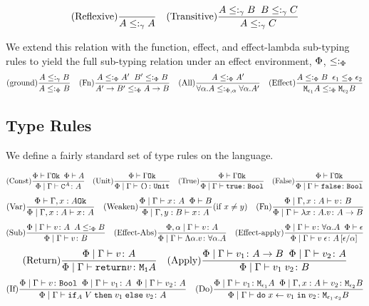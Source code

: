 \documentclass{Report}
\begin{document}
    \[
        \treerule{Reflexive}{}{A \subtype_{\ground} A}
        \quad
        \treerule{Transitive}{A \subtype_{\ground} B \s \s B \subtype_{\ground} C}{A \subtype_{\ground} C}
    \]

    We extend this relation with the function, effect, and effect-lambda sub-typing rules to yield the full sub-typing relation under an effect environment, $\P$, $\subtypep$
\[
    \treerule{ground}{A \subtype_{\ground} B}{A \subtypep B}
    \quad
    \treerule{Fn}{A \subtypep A' \s\s B' \subtypep B }{\fntype{A'}{B'} \subtypep \ab}
    \quad
    \treerule{All}{A\subtypep A'}{\all{\a}{A}\subtypepa\all{\a}{A'}}
    \quad
    \treerule{Effect}{A\subtypep B\s\s \e_1\subeffectp\e_2}{\M{\e_1}{A}\subtypep\M{\e_2}{B}}
\]


\subsection{Type Rules}
We define a fairly standard set of type rules on the language.

\[
    \treerule{Const}{\oke{\P}{\G}\s\s\wellformed{\P}{A}}{\gpetyperelation{\const{A}}{A}} 
    \quad
    \treerule{Unit}{\oke{\P}{\G}}{\gpetyperelation{\u}{\U}} 
    \quad
    \treerule{True}{\oke{\P}{\G}}{\gpetyperelation{\t}{\B}}
    \quad
    \treerule{False}{\oke{\P}{\G}}{\gpetyperelation{\f}{\B}}
\]
\[
\treerule{Var}{\oke{\P}{\gax}}{\etyperelation{\P}{\gax}{x}{A}}
\quad
\condtreerule{Weaken}{\etyperelation{\P}{\G}{x}{A}\s\s\wellformed{\P}{B}}{\etyperelation{\P}{\gby}{x}{A}}{x \neq y}
\quad
\treerule{Fn}{\etyperelation{\P}{\gax}{v}{B}}{\etyperelation{\P}{\G}{\lam{x}{A}{v}}{\ab}}
\]
\[
    \treerule{Sub}{\etyperelation{\P}{\G}{v}{A}\s\s A \subtypep B}{\etyperelation{\P}{\G}{v}{B}}
    \quad
    \treerule{Effect-Abs}{\etyperelation{\P,\a}{\G}{v}{A}}{\gpetyperelation{\elam{\a}{v}}{\all{\a}{A}}}
    \quad
    \treerule{Effect-apply}{\gpetyperelation{v}{\all{\a}A}\s\s\wellformed{\P}{\e}}{\gpetyperelation{\eapp{v}{\e}}{A\ssub{\a}{\e}}}
\]
\[
    \treerule{Return}{\gpetyperelation{v}{A}}{\gpetyperelation{\return{v}}{\moa}}
    \quad
    \treerule{Apply}{\gpetyperelation{v_1}{\ab}\s\s\gpetyperelation{v_2}{A}}{\gpetyperelation{\apply{v_1}{v_2}}{B}}
\]
\[
    \treerule{If}{\gpetyperelation{v}{\B} \s\s \gpetyperelation{v_1}{A}\s\s\gpetyperelation{v_2}{A}}{\gpetyperelation{\pifthenelse{A}{V}{v_1}{v_2}}{A}}
    \quad
    \treerule{Do}{\gpetyperelation{v_1}{\M{\e_1}{A}} \s\s \etyperelation{\P}{\gax}{v_2}{\M{\e_2}{B}}}{\gpetyperelation{\doin{x}{v_1}{v_2}}{\M{\e_1 \dot \e_2}{B}}}
\]
\end{document}
